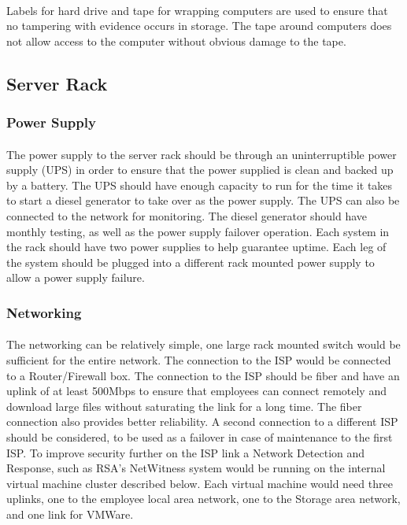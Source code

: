 \documentclass[12pt]{article}
\begin{document}
\paragraph{}
Labels for hard drive and tape for wrapping computers are used to ensure that no tampering with evidence occurs in storage. 
The tape around computers does not allow access to the computer without obvious damage to the tape. 

\subsection{Server Rack}
\subsubsection{Power Supply}
\paragraph{}
The power supply to the server rack should be through an uninterruptible power supply (UPS) in order to ensure that the power supplied is clean and backed up by a battery.
The UPS should have enough capacity to run for the time it takes to start a diesel generator to take over as the power supply.
The UPS can also be connected to the network for monitoring.  
The diesel generator should have monthly testing, as well as the power supply failover operation.
Each system in the rack should have two power supplies to help guarantee uptime.
Each leg of the system should be plugged into a different rack mounted power supply to allow a power supply failure.
 
\subsubsection{Networking}
\paragraph{}
The networking can be relatively simple, one large rack mounted switch would be sufficient for the entire network.
The connection to the ISP would be connected to a Router/Firewall box.
The connection to the ISP should be fiber and have an uplink of at least 500Mbps to ensure that employees can connect remotely and download large files without saturating the link for a long time.
The fiber connection also provides better reliability.
A second connection to a different ISP should be considered, to be used as a failover in case of maintenance to the first ISP.
To improve security further on the ISP link a Network Detection and Response, such as RSA's NetWitness system would be running on the internal virtual machine cluster described below.
Each virtual machine would need three uplinks, one to the employee local area network, one to the Storage area network, and one link for VMWare.
\end{document}
